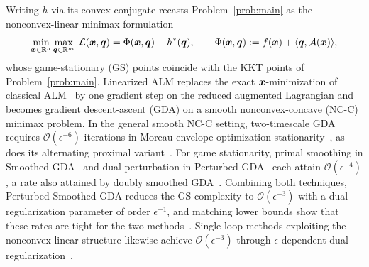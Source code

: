 Writing \(h\) via its convex conjugate recasts Problem~\eqref{prob:main} as the
nonconvex-linear minimax formulation
\[
  \min_{\bm{x}\in\mathbb{R}^n}\max_{\bm{q}\in\mathbb{R}^m}\;
  \mathcal{L}(\bm{x},\bm{q}) = \Phi(\bm{x},\bm{q})-h^*(\bm{q}), \qquad
  \Phi(\bm{x},\bm{q}):=f(\bm{x})+\langle\bm{q},\mathcal{A}(\bm{x})\rangle,
\]
whose game-stationary (GS) points coincide with the KKT points
of Problem~\eqref{prob:main}. Linearized ALM replaces the exact \(\bm{x}\)-minimization of classical
ALM~\cite{hestenes1969multiplier,powell1969method,rockafellar1973multiplier} by
one gradient step on the reduced augmented Lagrangian and becomes gradient
descent-ascent (GDA) on a smooth nonconvex-concave (NC-C) minimax problem. In
the general smooth NC-C setting, two-timescale GDA requires
\(\mathcal O(\epsilon^{-6})\) iterations in Moreau-envelope optimization
stationarity~\cite{lin2020gradient}, as does its alternating proximal
variant~\cite{bot2023alternating}. For game stationarity, primal
smoothing in Smoothed GDA~\cite{zhang2020smoothed} and dual perturbation in
Perturbed GDA~\cite{lu2020hybrid,xu2023unified} each attain
\(\mathcal O(\epsilon^{-4})\), a rate also attained by doubly smoothed
GDA~\cite{zheng2023universal}. Combining both techniques, Perturbed Smoothed GDA
reduces the GS complexity to \(\mathcal O(\epsilon^{-3})\) with a dual
regularization parameter of order \(\epsilon^{-1}\), and matching
lower bounds show that these rates are tight for the two
methods~\cite{li2026smoothing}. Single-loop methods exploiting the
nonconvex-linear structure likewise achieve \(\mathcal O(\epsilon^{-3})\) through
\(\epsilon\)-dependent dual
regularization~\cite{pan2021efficient,he2024approximation,xu2026rada}.

